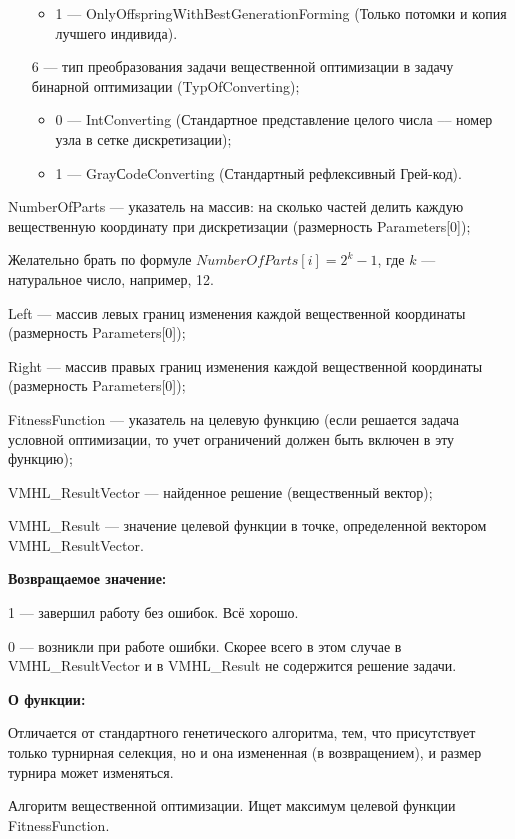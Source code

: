 \documentclass[a4paper,12pt]{article}
\begin{document}
\begin{itemize}
\begin{itemize}
       \item 1 --- OnlyOffspringWithBestGenerationForming (Только потомки и копия лучшего индивида).
	    \end{itemize}
 \item [6] --- тип преобразования задачи вещественной оптимизации в задачу бинарной оптимизации (TypOfConverting);
   \begin{itemize}
        \item 0 --- IntConverting (Стандартное представление целого числа –-- номер узла в сетке дискретизации);
        \item 1 --- GrayСodeConverting (Стандартный рефлексивный Грей-код).
			    \end{itemize}
 \end{itemize}
 
 NumberOfParts --- указатель на массив: на сколько частей делить каждую вещественную координату при дискретизации (размерность Parameters[0]);
 
  Желательно брать по формуле $NumberOfParts[i]=2^k-1$, где $k$ --- натуральное число, например, 12.
  
 Left --- массив левых границ изменения каждой вещественной координаты (размерность Parameters[0]);
 
 Right --- массив правых границ изменения каждой вещественной координаты (размерность Parameters[0]);
 
 FitnessFunction --- указатель на целевую функцию (если решается задача условной оптимизации, то учет ограничений должен быть включен в эту функцию);
 
 VMHL\_ResultVector --- найденное решение (вещественный вектор);
 
 VMHL\_Result --- значение целевой функции в точке, определенной вектором VMHL\_ResultVector.

\textbf{Возвращаемое значение:} 

 1 --- завершил работу без ошибок. Всё хорошо.
 
 0 --- возникли при работе ошибки. Скорее всего в этом случае в VMHL\_ResultVector и в VMHL\_Result не содержится решение задачи.

\textbf{О функции:}

Отличается от стандартного генетического алгоритма, тем, что присутствует только турнирная селекция, но и она измененная (в возвращением), и размер турнира может изменяться.

Алгоритм вещественной оптимизации. Ищет максимум целевой функции FitnessFunction.
\end{document}

